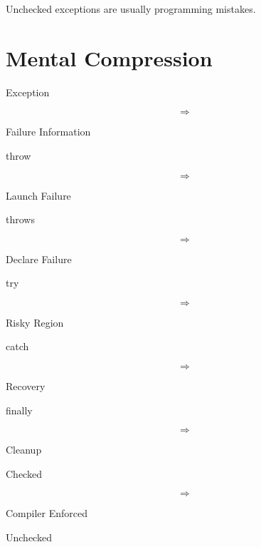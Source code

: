\documentclass[11pt,a4paper]{book}
\begin{document}

\begin{rosettarule}

Unchecked exceptions are usually programming mistakes.

\end{rosettarule}


\section{Mental Compression}

Exception

\[
\Rightarrow
\]

Failure Information


throw

\[
\Rightarrow
\]

Launch Failure


throws

\[
\Rightarrow
\]

Declare Failure


try

\[
\Rightarrow
\]

Risky Region


catch

\[
\Rightarrow
\]

Recovery


finally

\[
\Rightarrow
\]

Cleanup


Checked

\[
\Rightarrow
\]

Compiler Enforced


Unchecked
\end{document}
